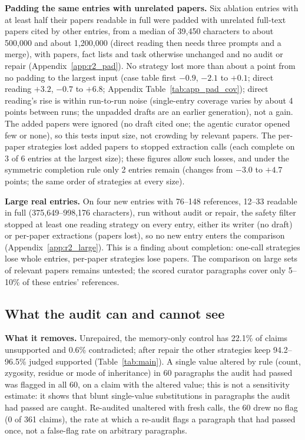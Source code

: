 \documentclass{article} %
\begin{document}
\textbf{Padding the same entries with unrelated papers.}\label{sec:size} Six ablation entries with at least half their papers readable in full were padded with unrelated full-text papers cited by other entries, from a median of 39,450 characters to about 500,000 and about 1,200,000 (direct reading then needs three prompts and a merge), with papers, fact lists and task otherwise unchanged and no audit or repair (Appendix~\ref{app:r2_pad}). No strategy lost more than about a point from no padding to the largest input (case table first $-0.9$, $-2.1$ to $+0.1$; direct reading $+3.2$, $-0.7$ to $+6.8$; Appendix Table~\ref{tab:app_pad_cov}); direct reading's rise is within run-to-run noise (single-entry coverage varies by about 4 points between runs; the unpadded drafts are an earlier generation), not a gain. The added papers were ignored (no draft cited one; the agentic curator opened few or none), so this tests input size, not crowding by relevant papers. The per-paper strategies lost added papers to stopped extraction calls (each complete on 3 of 6 entries at the largest size); these figures allow such losses, and under the symmetric completion rule only 2 entries remain (changes from $-3.0$ to $+4.7$ points; the same order of strategies at every size).

\textbf{Large real entries.} On four new entries with 76--148 references, 12--33 readable in full (375,649--998,176 characters), run without audit or repair, the safety filter stopped at least one reading strategy on every entry, either its writer (no draft) or per-paper extractions (papers lost), so no new entry enters the comparison (Appendix~\ref{app:r2_large}). This is a finding about completion: one-call strategies lose whole entries, per-paper strategies lose papers. The comparison on large sets of relevant papers remains untested; the scored curator paragraphs cover only 5--10\% of these entries' references.

\subsection{What the audit can and cannot see}
\label{sec:audit}
\textbf{What it removes.} Unrepaired, the memory-only control has 22.1\% of claims unsupported and 0.6\% contradicted; after repair the other strategies keep 94.2--96.5\% judged supported (Table~\ref{tab:main}). A single value altered by rule (count, zygosity, residue or mode of inheritance) in 60 paragraphs the audit had passed was flagged in all 60, on a claim with the altered value; this is not a sensitivity estimate: it shows that blunt single-value substitutions in paragraphs the audit had passed are caught. Re-audited unaltered with fresh calls, the 60 drew no flag (0 of 361 claims), the rate at which a re-audit flags a paragraph that had passed once, not a false-flag rate on arbitrary paragraphs.
\end{document}
